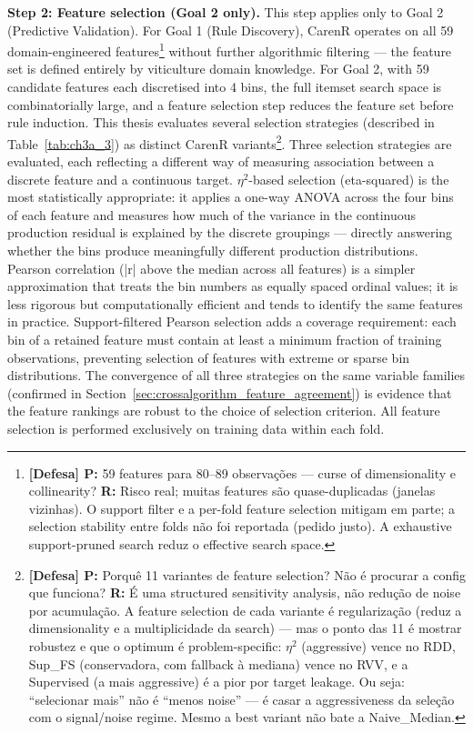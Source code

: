 \textbf{Step 2: Feature selection (Goal 2 only). }This step applies only to Goal 2 (Predictive Validation). For Goal 1 (Rule Discovery), CarenR operates on all 59 domain-engineered features\footnote{\textbf{[Defesa] P:} 59 features para 80--89 observações --- curse of dimensionality e collinearity? \textbf{R:} Risco real; muitas features são quase-duplicadas (janelas vizinhas). O support filter e a per-fold feature selection mitigam em parte; a selection stability entre folds não foi reportada (pedido justo). A exhaustive support-pruned search reduz o effective search space.} without further algorithmic filtering --- the feature set is defined entirely by viticulture domain knowledge. For Goal 2, with 59 candidate features each discretised into 4 bins, the full itemset search space is combinatorially large, and a feature selection step reduces the feature set before rule induction. This thesis evaluates several selection strategies (described in Table~\ref{tab:ch3a_3}) as distinct CarenR variants\footnote{\textbf{[Defesa] P:} Porquê 11 variantes de feature selection? Não é procurar a config que funciona? \textbf{R:} É uma structured sensitivity analysis, não redução de noise por acumulação. A feature selection de cada variante é regularização (reduz a dimensionality e a multiplicidade da search) --- mas o ponto das 11 é mostrar robustez e que o optimum é problem-specific: $\eta^2$ (aggressive) vence no RDD, Sup\_FS (conservadora, com fallback à mediana) vence no RVV, e a Supervised (a mais aggressive) é a pior por target leakage. Ou seja: ``selecionar mais'' não é ``menos noise'' --- é casar a aggressiveness da seleção com o signal/noise regime. Mesmo a best variant não bate a Naive\_Median.}. Three selection strategies are evaluated, each reflecting a different way of measuring association between a discrete feature and a continuous target. $\eta$$^2$-based selection (eta-squared) is the most statistically appropriate: it applies a one-way ANOVA across the four bins of each feature and measures how much of the variance in the continuous production residual is explained by the discrete groupings --- directly answering whether the bins produce meaningfully different production distributions. Pearson correlation (|r| above the median across all features) is a simpler approximation that treats the bin numbers as equally spaced ordinal values; it is less rigorous but computationally efficient and tends to identify the same features in practice. Support-filtered Pearson selection adds a coverage requirement: each bin of a retained feature must contain at least a minimum fraction of training observations, preventing selection of features with extreme or sparse bin distributions. The convergence of all three strategies on the same variable families (confirmed in Section~\ref{sec:crossalgorithm_feature_agreement}) is evidence that the feature rankings are robust to the choice of selection criterion. All feature selection is performed exclusively on training data within each fold.


